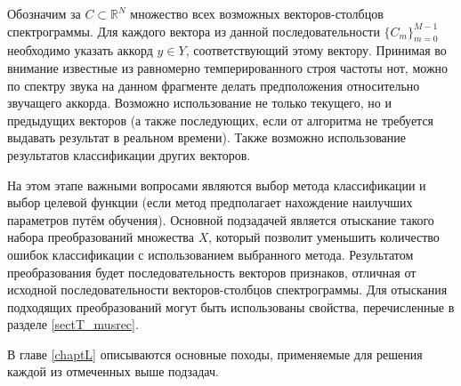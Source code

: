Обозначим за $C \subset \mathbb{R}^N$ множество всех возможных векторов-столбцов
спектрограммы. Для каждого вектора из данной последовательности
$\{C_m\}_{m=0}^{M-1}$ необходимо указать аккорд $y \in Y$, соответствующий
этому вектору. Принимая во внимание известные из равномерно темперированного
строя частоты нот, можно по спектру звука на данном фрагменте делать
предположения относительно звучащего аккорда. Возможно использование не только
текущего, но и предыдущих векторов (а также последующих, если от алгоритма не
требуется выдавать результат в реальном времени). Также возможно использование
результатов классификации других векторов.

На этом этапе важными вопросами являются выбор метода классификации и выбор
целевой функции (если метод предполагает нахождение наилучших параметров путём
обучения). Основной подзадачей является отыскание такого набора преобразований
множества $X$, который позволит уменьшить количество ошибок классификации с
использованием выбранного метода. Результатом преобразования будет
последовательность векторов признаков, отличная от исходной последовательности
векторов-столбцов спектрограммы. Для отыскания подходящих преобразований могут
быть использованы свойства, перечисленные в разделе \ref{sectT_musrec}.

В главе \ref{chaptL} описываются основные походы, применяемые для решения
каждой из отмеченных выше подзадач.

\clearpage